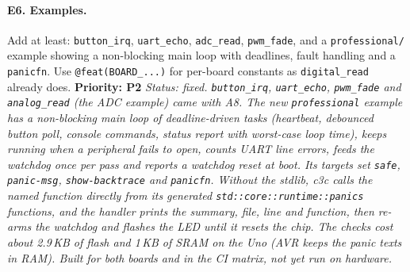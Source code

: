 \documentclass[11pt,a4paper]{article}
\newcommand{\pkg}[1]{\texttt{#1}}
\newcommand{\prio}[1]{\textbf{Priority: #1}}
\begin{document}
\paragraph{E6. Examples.}
Add at least: \pkg{button\_irq}, \pkg{uart\_echo}, \pkg{adc\_read}, \pkg{pwm\_fade}, and a
\pkg{professional/} example showing a non-blocking main loop with deadlines, fault handling and a
\pkg{panicfn}. Use \pkg{@feat(BOARD\_...)} for per-board constants as \pkg{digital\_read} already
does. \prio{P2}
\textit{Status: fixed. \pkg{button\_irq}, \pkg{uart\_echo}, \pkg{pwm\_fade} and \pkg{analog\_read} (the ADC example) came with A8. The new \pkg{professional} example has a non-blocking main loop of deadline-driven tasks (heartbeat, debounced button poll, console commands, status report with worst-case loop time), keeps running when a peripheral fails to open, counts UART line errors, feeds the watchdog once per pass and reports a watchdog reset at boot. Its targets set \pkg{safe}, \pkg{panic-msg}, \pkg{show-backtrace} and \pkg{panicfn}. Without the stdlib, c3c calls the named function directly from its generated \pkg{std::core::runtime::panics} functions, and the handler prints the summary, file, line and function, then re-arms the watchdog and flashes the LED until it resets the chip. The checks cost about 2.9\,KB of flash and 1\,KB of SRAM on the Uno (AVR keeps the panic texts in RAM). Built for both boards and in the CI matrix, not yet run on hardware.}
\end{document}

